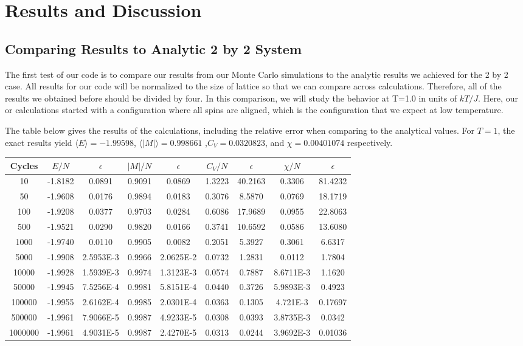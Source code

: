 \documentclass[%
oneside,                 %
final,                   %
10pt]{article}
\begin{document}
\section{Results and Discussion}

\subsection{Comparing Results to Analytic 2 by 2 System}

The first test of our code is to compare our results from our Monte Carlo simulations to the analytic results we achieved for the 2 by 2 case.  All results for our code will be normalized to the size of lattice so that we can compare across calculations.  Therefore, all of the results we obtained before should be divided by four.  In this comparison, we will study the behavior at T=1.0 in units of $kT/J$.  Here, our or calculations started with a configuration where all spins are aligned, which is the configuration that we expect at low temperature.

The table below gives the results of the calculations, including the relative error when comparing to the analytical values.  For $T=1$, the exact results yield $\langle E \rangle = -1.99598$, $\langle |M| \rangle = 0.998661$ ,$C_V = 0.0320823 $, and $ \chi = 0.00401074$ respectively.

\begin{center} 
\begin{tabular}{ |c|c|c|c|c|c|c|c|c| }
\hline
Cycles & $E/N$ & $\epsilon$ & $|M|/N$ & $\epsilon$ &  $C_V/N$ & $\epsilon$ & $\chi/N$ & $\epsilon$ \\
\hline
10 & -1.8182 & 0.0891 & 0.9091 & 0.0869 & 1.3223 & 40.2163 & 0.3306 & 81.4232 \\
50 & -1.9608 & 0.0176 & 0.9894 & 0.0183 & 0.3076 & 8.5870 & 0.0769 & 18.1719 \\
100 & -1.9208 & 0.0377 & 0.9703 &  0.0284 & 0.6086 & 17.9689 & 0.0955 & 22.8063 \\
500 & -1.9521 & 0.0290 & 0.9820 & 0.0166 & 0.3741 & 10.6592 & 0.0586 & 13.6080 \\
1000 & -1.9740 & 0.0110 & 0.9905 & 0.0082 & 0.2051 & 5.3927 & 0.3061 & 6.6317 \\
5000 & -1.9908 & 2.5953E-3 & 0.9966 & 2.0625E-2 & 0.0732 & 1.2831 & 0.0112 & 1.7804 \\
10000 & -1.9928 & 1.5939E-3 & 0.9974 & 1.3123E-3 & 0.0574 & 0.7887 & 8.6711E-3&1.1620 \\
50000 &-1.9945 & 7.5256E-4 & 0.9981& 5.8151E-4& 0.0440 & 0.3726 & 5.9893E-3&0.4923 \\
100000 & -1.9955 & 2.6162E-4 & 0.9985 & 2.0301E-4& 0.0363 & 0.1305 & 4.721E-3&0.17697\\
500000 & -1.9961 & 7.9066E-5 & 0.9987 & 4.9233E-5&0.0308&0.0393&3.8735E-3& 0.0342 \\
1000000&-1.9961 &4.9031E-5 & 0.9987 & 2.4270E-5&0.0313&0.0244&3.9692E-3&0.01036 \\
\hline
\end{tabular}

\label{table:test}
\end{center}
\end{document}
